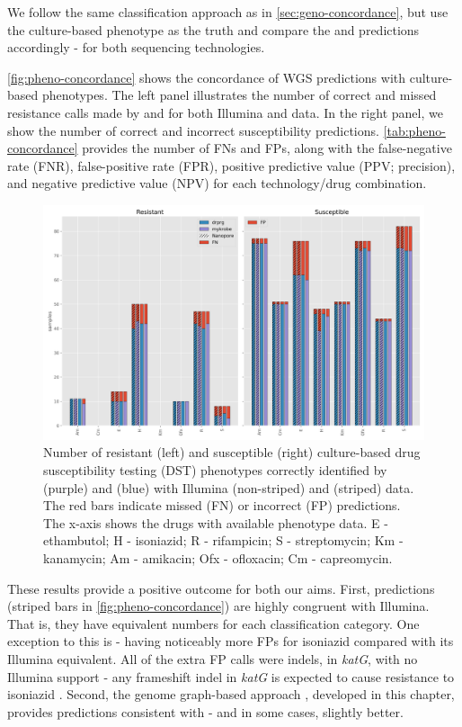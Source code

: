We follow the same classification approach as in \autoref{sec:geno-concordance}, but use the culture-based phenotype as the truth and compare the \mykrobe{} and \drprg{} predictions accordingly - for both sequencing technologies.

\autoref{fig:pheno-concordance} shows the concordance of WGS predictions with culture-based phenotypes. The left panel illustrates the number of correct and missed resistance calls made by \mykrobe{} and \drprg{} for both Illumina and \ont{} data. In the right panel, we show the number of correct and incorrect susceptibility predictions. \autoref{tab:pheno-concordance} provides the number of FNs and FPs, along with the false-negative rate (FNR), false-positive rate (FPR), positive predictive value (PPV; precision), and negative predictive value (NPV) for each technology/drug combination. 

\begin{figure}
\begin{center}
\includegraphics[width=0.90\columnwidth]{Chapter3/Figs/pheno_concordance_plot.png}
\caption{{Number of resistant (left) and susceptible (right) culture-based drug susceptibility testing (DST) phenotypes correctly identified by \mykrobe{} (purple) and \drprg{} (blue) with Illumina (non-striped) and \ont{} (striped) data. The red bars indicate missed (FN) or incorrect (FP) predictions. The x-axis shows the drugs with available phenotype data. E - ethambutol; H - isoniazid; R - rifampicin; S - streptomycin; Km - kanamycin; Am - amikacin; Ofx - ofloxacin; Cm - capreomycin.
{\label{fig:pheno-concordance}}
}}
\end{center}
\end{figure}

These results provide a positive outcome for both our aims. First, \ont{} predictions (striped bars in \autoref{fig:pheno-concordance}) are highly congruent with Illumina. That is, they have equivalent numbers for each classification category. One exception to this is \mykrobe{}-\ont{} having noticeably more FPs for isoniazid compared with its Illumina equivalent. All of the extra \ont{} FP calls were indels, in \textit{katG}, with no Illumina support - any frameshift indel in \textit{katG} is expected to cause resistance to isoniazid \cite{miotto2017}. Second, the genome graph-based approach \drprg{}, developed in this chapter, provides predictions consistent with \mykrobe{} - and in some cases, slightly better. 

